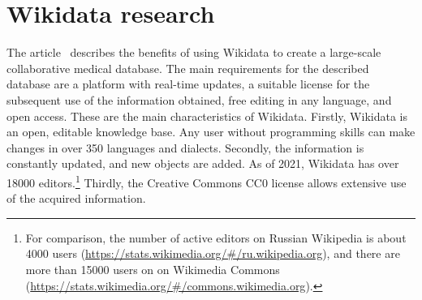 \section{Wikidata research}
The article~ describes the benefits of using Wikidata to create a large-scale collaborative medical database. The main requirements for the described database are a platform with real-time updates, a suitable license for the subsequent use of the information obtained, free editing in any language, and open access. These are the main characteristics of Wikidata. Firstly, Wikidata is an open, editable knowledge base. Any user without programming skills can make changes in over 350 languages and dialects. Secondly, the information is constantly updated, and new objects are added. As of 2021, Wikidata has over \num{18000} editors.\footnote{For comparison, the number of active editors on Russian Wikipedia
is about \num{4000} users (\href{https://stats.wikimedia.org/\#/ru.wikipedia.org}{https://stats.wikimedia.org/\#/ru.wikipedia.org}), and there are more than \num{15000} users on on Wikimedia Commons (\href{https://stats.wikimedia.org/\#/commons.wikimedia.org}{https://stats.wikimedia.org/\#/commons.wikimedia.org}).} Thirdly, the Creative Commons CC0 license allows extensive use of the acquired information.

